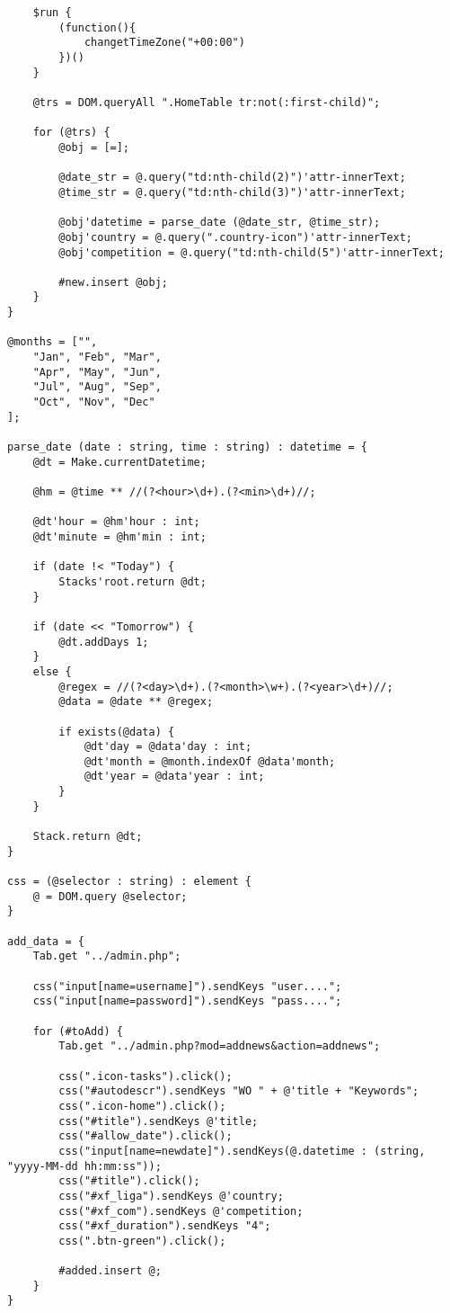 \begin{lstlisting}
	$run {
		(function(){
			changetTimeZone("+00:00")
		})()
	}

	@trs = DOM.queryAll ".HomeTable tr:not(:first-child)";

	for (@trs) {
		@obj = [=];

		@date_str = @.query("td:nth-child(2)")'attr-innerText;
		@time_str = @.query("td:nth-child(3)")'attr-innerText;

		@obj'datetime = parse_date (@date_str, @time_str);
		@obj'country = @.query(".country-icon")'attr-innerText;
		@obj'competition = @.query("td:nth-child(5")'attr-innerText;

		#new.insert @obj;
	}
}

@months = ["",
	"Jan", "Feb", "Mar",
	"Apr", "May", "Jun",
	"Jul", "Aug", "Sep",
	"Oct", "Nov", "Dec"
];

parse_date (date : string, time : string) : datetime = {
	@dt = Make.currentDatetime;

	@hm = @time ** //(?<hour>\d+).(?<min>\d+)//;

	@dt'hour = @hm'hour : int;
	@dt'minute = @hm'min : int;

	if (date !< "Today") {
		Stacks'root.return @dt;
	}

	if (date << "Tomorrow") {
		@dt.addDays 1;
	}
	else {
		@regex = //(?<day>\d+).(?<month>\w+).(?<year>\d+)//;
		@data = @date ** @regex;

		if exists(@data) {
			@dt'day = @data'day : int;
			@dt'month = @month.indexOf @data'month;
			@dt'year = @data'year : int;
		}
	}

	Stack.return @dt;
}

css = (@selector : string) : element {
	@ = DOM.query @selector;
}

add_data = {
	Tab.get "../admin.php";

	css("input[name=username]").sendKeys "user....";
	css("input[name=password]").sendKeys "pass....";

	for (#toAdd) {
		Tab.get "../admin.php?mod=addnews&action=addnews";

		css(".icon-tasks").click();
		css("#autodescr").sendKeys "WO " + @'title + "Keywords";
		css(".icon-home").click();
		css("#title").sendKeys @'title;
		css("#allow_date").click();
		css("input[name=newdate]").sendKeys(@.datetime : (string, "yyyy-MM-dd hh:mm:ss"));
		css("#title").click();
		css("#xf_liga").sendKeys @'country;
		css("#xf_com").sendKeys @'competition;
		css("#xf_duration").sendKeys "4";
		css(".btn-green").click();

		#added.insert @;
	}
}


\end{lstlisting}
